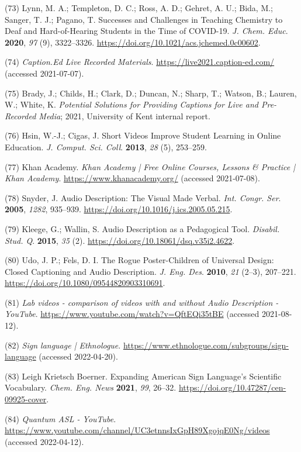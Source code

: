 \documentclass[11.5pt]{sig-alternate} %
\begin{document}
(73)	Lynn, M. A.; Templeton, D. C.; Ross, A. D.; Gehret, A. U.; Bida, M.; Sanger, T. J.; Pagano, T. Successes and Challenges in Teaching Chemistry to Deaf and Hard-of-Hearing Students in the Time of COVID-19. \textit{J. Chem. Educ}. \textbf{2020}, \textit{97} (9), 3322–3326. \url{https://doi.org/10.1021/acs.jchemed.0c00602}.

(74)	\textit{Caption.Ed Live Recorded Materials}. \url{https://live2021.caption-ed.com/} (accessed 2021-07-07).

(75)	Brady, J.; Childs, H.; Clark, D.; Duncan, N.; Sharp, T.; Watson, B.; Lauren, W.; White, K. \textit{Potential Solutions for Providing Captions for Live and Pre-Recorded Media}; 2021, University of Kent internal report.

(76)	Hsin, W.-J.; Cigas, J. Short Videos Improve Student Learning in Online Education. \textit{J. Comput. Sci. Coll}. \textbf{2013}, \textit{28} (5), 253–259.

(77)	Khan Academy. \textit{Khan Academy | Free Online Courses, Lessons \& Practice | Khan Academy}. \url{https://www.khanacademy.org/} (accessed 2021-07-08).

(78)	Snyder, J. Audio Description: The Visual Made Verbal. \textit{Int. Congr. Ser}. \textbf{2005}, \textit{1282}, 935–939. \url{https://doi.org/10.1016/j.ics.2005.05.215}.

(79)	Kleege, G.; Wallin, S. Audio Description as a Pedagogical Tool. \textit{Disabil. Stud. Q}. \textbf{2015}, \textit{35} (2). \url{https://doi.org/10.18061/dsq.v35i2.4622}.

(80)	Udo, J. P.; Fels, D. I. The Rogue Poster-Children of Universal Design: Closed Captioning and Audio Description. \textit{J. Eng. Des}. \textbf{2010}, \textit{21} (2–3), 207–221. \url{https://doi.org/10.1080/09544820903310691}.

(81)	\textit{Lab videos - comparison of videos with and without Audio Description - YouTube}. \url{https://www.youtube.com/watch?v=QftEQi35tBE} (accessed 2021-08-12).

(82)	\textit{Sign language | Ethnologue}. \url{https://www.ethnologue.com/subgroups/sign-language} (accessed 2022-04-20).

(83)	Leigh Krietsch Boerner. Expanding American Sign Language’s Scientific Vocabulary. \textit{Chem. Eng. News} \textbf{2021}, \textit{99}, 26–32. \url{https://doi.org/10.47287/cen-09925-cover}.

(84)	\textit{Quantum ASL - YouTube}. \url{https://www.youtube.com/channel/UC3etnnsIxGpH89XgojqE0Ng/videos} (accessed 2022-04-12).
\end{document}
